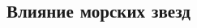\documentclass[a0,portrait]{a0poster}
\begin{document}
\section*{}

\vspace{0.5cm}


\begin{multicols}{2}

\subsection*{Влияние морских звезд}
		






		
		
		















\end{multicols}
\end{document}
